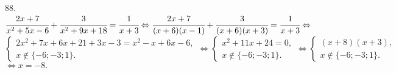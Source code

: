 88. $\cfrac{2x+7}{x^2+5x-6}+\cfrac{3}{x^2+9x+18}=\cfrac{1}{x+3}\Leftrightarrow
\cfrac{2x+7}{(x+6)(x-1)}+\cfrac{3}{(x+6)(x+3)}=\cfrac{1}{x+3}\Leftrightarrow$\\$
\begin{cases} 2x^2+7x+6x+21+3x-3=x^2-x+6x-6,\\
x\notin\{-6;-3;1\}.\end{cases}\Leftrightarrow
\begin{cases} x^2+11x+24=0,\\
x\notin\{-6;-3;1\}.\end{cases}\Leftrightarrow
\begin{cases} (x+8)(x+3),\\
x\notin\{-6;-3;1\}.\end{cases}$\\$\Leftrightarrow x=-8.$\\
